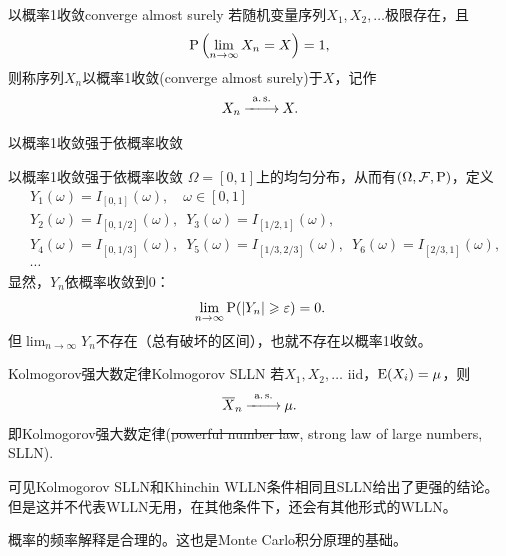 
\begin{definition}{以概率1收敛}{converge almost surely}
	若随机变量序列$X_1,X_2,\ldots$极限存在，且
	\begin{equation}
		\P\kh{\lim_{n\to\infty}X_n=X}=1,
	\end{equation}
	则称序列$X_n$以概率1收敛(converge almost surely)于$X$，记作
	\begin{equation}
		X_n\asto X.
	\end{equation}
\end{definition}

\begin{corollary}
	以概率1收敛强于依概率收敛
\end{corollary}

\begin{example}{以概率1收敛强于依概率收敛}{}
	$\Omega=[0,1]$上的均匀分布，从而有$(\Omega,\cF,\P)$，定义
	\begin{align*}
		&Y_1(\omega)=I_{[0,1]}(\omega),\quad\omega\in[0,1]\\
		&Y_2(\omega)=I_{[0,1/2]}(\omega),\enspace Y_3(\omega)=I_{[1/2,1]}(\omega),\\
		&Y_4(\omega)=I_{[0,1/3]}(\omega),\enspace Y_5(\omega)=I_{[1/3,2/3]}(\omega),\enspace Y_6(\omega)=I_{[2/3,1]}(\omega),\\
		&\cdots
	\end{align*}
	显然，$Y_n$依概率收敛到0：
	\[
		\lim_{n\to\infty}\P(|Y_n|\geqslant\varepsilon)=0.
	\]
	但$\lim_{n\to\infty}Y_n$不存在（总有破坏的区间），也就不存在以概率1收敛。
\end{example}

\begin{theorem}{Kolmogorov强大数定律}{Kolmogorov SLLN}
	若$X_1,X_2,\ldots$ iid，$\E(X_i)=\mu$，则 
	\begin{equation}
		\avg X_n\asto\mu.
	\end{equation}
	即Kolmogorov强大数定律(\sout{powerful number law}, strong law of large numbers, SLLN).
\end{theorem}

\begin{remark}
	可见Kolmogorov SLLN和Khinchin WLLN条件相同且SLLN给出了更强的结论。
	但是这并不代表WLLN无用，在其他条件下，还会有其他形式的WLLN。
\end{remark}

\begin{corollary}
	概率的频率解释是合理的。这也是Monte Carlo积分原理的基础。
\end{corollary}

